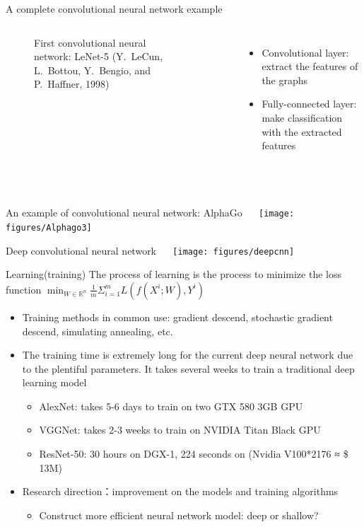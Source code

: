 \documentclass{beamer}
\begin{document}
\begin{CJK*}{UTF8}{gbsn}
\begin{frame}{A complete convolutional neural network example}
\begin{columns}
\begin{figure}
\begin{center}
\caption{First convolutional neural network: LeNet-5 (Y. LeCun, L. Bottou, Y. Bengio, and P. Haffner, 1998)}
\end{center}
\end{figure} 
\begin{itemize}
\item Convolutional layer: extract the features of the graphs 
\item Fully-connected layer: make classification with the extracted features
\end{itemize}
\end{columns}  
\end{frame}



\begin{frame}{An example of convolutional neural network: AlphaGo}
\centering  
\texttt{[image: figures/Alphago3]}
\end{frame}


\begin{frame}{Deep convolutional neural network}
\centering  
\texttt{[image: figures/deepcnn]}
\end{frame}



\begin{frame}{Learning(training)}
The process of learning is the process to minimize the loss function 
$\min_{W\in \mathbb{R}^n}\frac{1}{m}\Sigma^m_{i=1}L(f(X^i;W),Y^i)$

\begin{itemize}
\item Training methods in common use: gradient descend, stochastic gradient descend, simulating annealing, etc.

\item The training time is extremely long for the current deep neural network due to the plentiful parameters. It takes several weeks to train a traditional deep learning model
    \begin{itemize}
\item AlexNet: takes 5-6 days to train on two GTX 580 3GB GPU
\item VGGNet: takes 2-3 weeks to train on NVIDIA Titan Black GPU
\item ResNet-50: 30 hours on DGX-1, 224 seconds on (Nvidia V100*2176 ≈ \$ 13M)
\end{itemize}
\item Research direction：improvement on the models and training algorithms
\begin{itemize}
\item Construct more efficient neural network model: deep or shallow?


\end{itemize}
\end{itemize}
\end{frame}
\end{CJK*}
\end{document}
